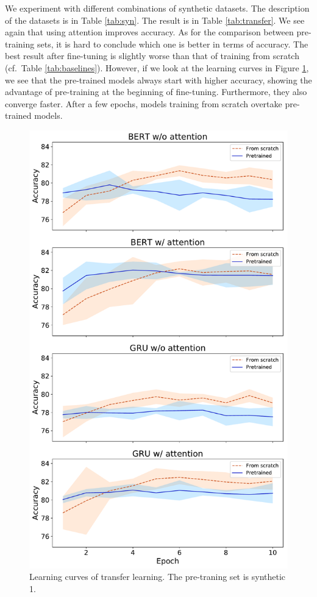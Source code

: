 We experiment with different combinations of synthetic datasets. The description of the datasets is in Table \ref{tab:syn}.
The result is in Table \ref{tab:transfer}.
We see again that using attention improves accuracy. As for the comparison between pre-training sets, it is hard to conclude which one is better in terms of accuracy. The best result after fine-tuning is slightly worse than that of training from scratch (cf.\ Table \ref{tab:baselines}).
However, if we look at the learning curves in Figure \ref{fig:curve}, we see that the pre-trained models always start with higher accuracy, showing the advantage of pre-training at the beginning of fine-tuning. Furthermore, they also converge faster. After a few epochs, models training from scratch overtake pre-trained models.

\begin{figure}
    \centering
    \includegraphics[width=0.8\linewidth]{figures/learning_curves.pdf}
    \caption[Learning curves of transfer learning]{Learning curves of transfer learning. The pre-traning set is synthetic 1.}
    \label{fig:curve}
\end{figure}
